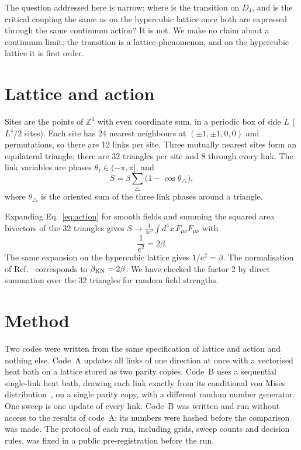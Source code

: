 \documentclass[aps,prd,twocolumn,superscriptaddress,floatfix,nofootinbib]{revtex4-2}
\begin{document}
The question addressed here is narrow: where is the transition on $D_4$, and is the critical
coupling the same as on the hypercubic lattice once both are expressed through the same
continuum action? It is not. We make no claim about a continuum limit; the transition is a
lattice phenomenon, and on the hypercubic lattice it is first order.

\section{Lattice and action}

Sites are the points of $\mathbb{Z}^4$ with even coordinate sum, in a periodic box of side $L$
($L^4/2$ sites). Each site has 24 nearest neighbours at $(\pm1,\pm1,0,0)$ and permutations, so
there are 12 links per site. Three mutually nearest sites form an equilateral triangle; there
are 32 triangles per site and 8 through every link. The link variables are phases
$\theta_\ell\in(-\pi,\pi]$, and
\begin{equation}
S=\beta\sum_{\triangle}\bigl(1-\cos\theta_\triangle\bigr),
\label{eq:action}
\end{equation}
where $\theta_\triangle$ is the oriented sum of the three link phases around a triangle.

Expanding Eq.~\eqref{eq:action} for smooth fields and summing the squared area bivectors of
the 32 triangles gives $S\to\frac{1}{4e^2}\int d^4x\,F_{\mu\nu}F_{\mu\nu}$ with
\begin{equation}
\frac{1}{e^2}=2\beta .
\end{equation}
The same expansion on the hypercubic lattice gives $1/e^2=\beta$. The normalisation of
Ref.~\cite{KatzNogradi2026} corresponds to $\beta_{\rm KN}=2\beta$. We have checked the
factor 2 by direct summation over the 32 triangles for random field strengths.

\section{Method}

Two codes were written from the same specification of lattice and action and nothing else.
Code~A updates all links of one direction at once with a vectorised heat bath on a lattice
stored as two parity copies. Code~B uses a sequential single-link heat bath, drawing each link
exactly from its conditional von Mises distribution~\cite{BestFisher1979}, on a single parity
copy, with a different random number generator. One sweep is one update of every link. Code~B
was written and run without access to the results of code~A; its numbers were hashed before
the comparison was made. The protocol of each run, including grids, sweep counts and decision
rules, was fixed in a public pre-registration before the run.
\end{document}
